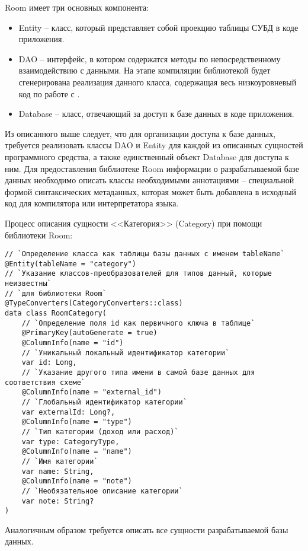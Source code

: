 Room имеет три основных компонента:
\begin{itemize}
    \item Entity -- класс, который представляет собой проекцию таблицы СУБД \sqlite в коде приложения.
    \item DAO -- интерфейс, в котором содержатся методы по непосредственному взаимодействию с данными.
    На этапе компиляции библиотекой будет сгенерирована реализация данного класса, содержащая весь низкоуровневый код по работе с \sqlite.
    \item Database -- класс, отвечающий за доступ к базе данных в коде приложения.
\end{itemize}

Из описанного выше следует, что для организации доступа к базе данных, требуется реализовать классы DAO и Entity для каждой из описанных сущностей программного средства, а также единственный объект Database для доступа к ним.
Для предоставления библиотеке Room информации о разрабатываемой базе данных необходимо описать классы необходимыми аннотациями -- специальной формой синтаксических метаданных, которая может быть добавлена в исходный код для компилятора или интерпретатора языка.

Процесс описания сущности <<Категория>> (Category) при помощи библиотеки Room:

\begin{lstlisting}[style=standard]
// `Определение класса как таблицы базы данных с именем tableName`
@Entity(tableName = "category")
// `Указание классов-преобразователей для типов данный, которые неизвестны`
// `для библиотеки Room`
@TypeConverters(CategoryConverters::class)
data class RoomCategory(
    // `Определение поля id как первичного ключа в таблице`
    @PrimaryKey(autoGenerate = true)
    @ColumnInfo(name = "id")
    // `Уникальный локальный идентификатор категории`
    var id: Long,
    // `Указание другого типа имени в самой базе данных для соответствия схеме`
    @ColumnInfo(name = "external_id")
    // `Глобальный идентификатор категории`
    var externalId: Long?,
    @ColumnInfo(name = "type")
    // `Тип категории (доход или расход)`
    var type: CategoryType,
    @ColumnInfo(name = "name")
    // `Имя категории`
    var name: String,
    @ColumnInfo(name = "note")
    // `Необязательное описание категории`
    var note: String?
)
\end{lstlisting}

Аналогичным образом требуется описать все сущности разрабатываемой базы данных.

